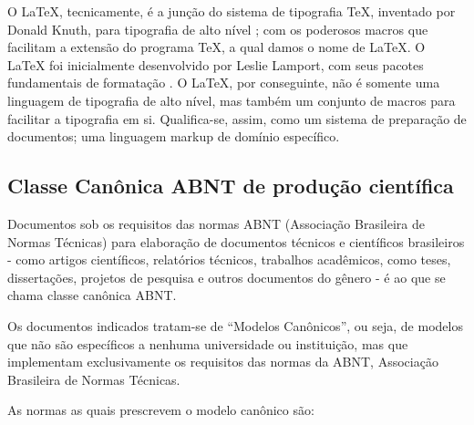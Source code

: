 \documentclass[
12pt,				%
openright,			%
oneside,			%
a4paper,			%
english,			%
french,				%
spanish,			%
brazil,				%
]{abntex2}
\begin{document}
O \LaTeX, tecnicamente, é a junção do sistema de tipografia \TeX,
inventado por Donald Knuth, para tipografia de alto nível
\cite{knuth1986}; com os poderosos macros que facilitam a extensão do programa \TeX, a qual damos o nome de
\LaTeX. O \LaTeX{} foi inicialmente desenvolvido por Leslie Lamport, com
seus pacotes fundamentais de formatação \cite{lamport1994}. O \LaTeX,
por conseguinte, não é somente uma linguagem de tipografia de alto
nível, mas também um conjunto de macros para facilitar a tipografia em
si. Qualifica-se, assim, como um sistema de preparação de documentos;
uma linguagem markup de domínio específico.

\subsection{Classe Canônica ABNT de produção científica}

Documentos sob os requisitos das normas ABNT (Associação Brasileira de Normas
Técnicas) para elaboração de documentos técnicos e científicos
brasileiros - como artigos científicos, relatórios técnicos, trabalhos
acadêmicos, como teses, dissertações, projetos de pesquisa e outros
documentos do gênero \cite{abntex2012} - é ao que se chama classe
canônica ABNT.

\begin{citacao}
  Os documentos indicados tratam-se de “Modelos Canônicos”, ou seja,
  de modelos que não são específicos a nenhuma universidade ou instituição, mas
  que implementam exclusivamente os requisitos das normas da ABNT, Associação
  Brasileira de Normas Técnicas. \cite[Cap. 1]{araujoclasse}
\end{citacao}

\clearpage

As normas as quais prescrevem o modelo canônico são:
\end{document}
